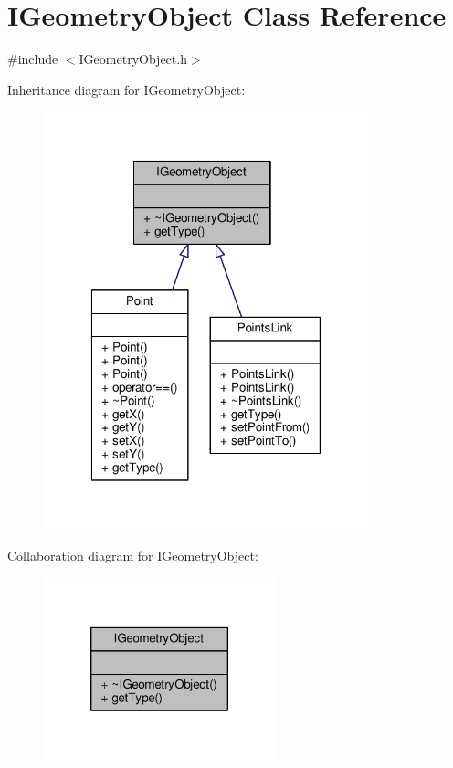 \hypertarget{class_i_geometry_object}{\section{I\-Geometry\-Object Class Reference}
\label{class_i_geometry_object}
}


{\ttfamily \#include $<$I\-Geometry\-Object.\-h$>$}



Inheritance diagram for I\-Geometry\-Object\-:\nopagebreak
\begin{figure}[H]
\begin{center}
\leavevmode
\includegraphics[width=267pt]{class_i_geometry_object__inherit__graph}
\end{center}
\end{figure}


Collaboration diagram for I\-Geometry\-Object\-:
\nopagebreak
\begin{figure}[H]
\begin{center}
\leavevmode
\includegraphics[width=190pt]{class_i_geometry_object__coll__graph}
\end{center}
\end{figure}
